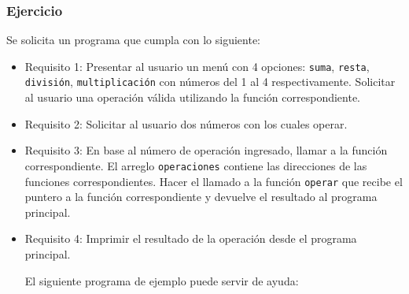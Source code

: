 \subsubsection{Ejercicio}
Se solicita un programa que cumpla con lo siguiente:
\begin{itemize}[a)]
  \item Requisito 1:
    Presentar al usuario un menú con 4 opciones: \texttt{suma}, \texttt{resta}, \texttt{división}, \texttt{multiplicación} con números del 1 al 4 respectivamente. Solicitar al usuario una operación válida utilizando la función correspondiente.

  \item Requisito 2:
    Solicitar al usuario dos números con los cuales operar.

  \item Requisito 3:
    En base al número de operación ingresado, llamar a la función correspondiente. El arreglo \texttt{operaciones} contiene las direcciones de las funciones correspondientes. Hacer el llamado a la función \texttt{operar} que recibe el puntero a la función correspondiente y devuelve el resultado al programa principal.

  \item Requisito 4:
    Imprimir el resultado de la operación desde el programa principal.

    El siguiente programa de ejemplo puede servir de ayuda:

    \lstset{inputencoding=utf8/latin1}
    
\end{itemize}
